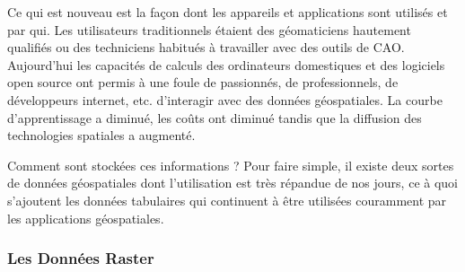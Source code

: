 Ce qui est nouveau est la fa\c{c}on dont les appareils et applications sont utilis\'es et par qui. Les utilisateurs traditionnels \'etaient des g\'eomaticiens hautement qualifi\'es ou des techniciens habitu\'es \`a travailler avec des outils de CAO. Aujourd'hui les capacit\'es de calculs des ordinateurs domestiques et des logiciels open source ont permis \`a une foule de passionn\'es, de professionnels, de d\'eveloppeurs internet, etc. d'interagir avec des donn\'ees g\'eospatiales. La courbe d'apprentissage a diminu\'e, les co\^uts ont diminu\'e tandis que la diffusion des technologies spatiales a augment\'e.

Comment sont stock\'ees ces informations ? Pour faire simple, il existe deux sortes de donn\'ees g\'eospatiales dont l'utilisation est tr\`es r\'epandue de nos jours, ce \`a quoi s'ajoutent les donn\'ees tabulaires qui continuent \`a \^etre utilis\'ees couramment par les applications g\'eospatiales.

%
%
%

\subsubsection{Les Donn\'ees Raster}\label{label_rasterdata}

